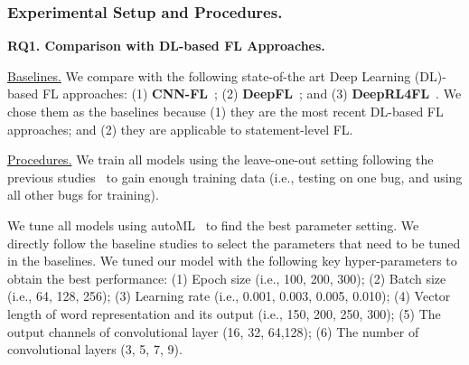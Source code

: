 \subsubsection{Experimental Setup and Procedures.\\}

{\bf RQ1. Comparison with DL-based FL Approaches.}

\underline{Baselines.}
We compare {\tool} with the following state-of-the art Deep Learning
(DL)-based FL approaches: (1) \textbf{CNN-FL}~\cite{zhang2019cnn}; (2)
{\bf DeepFL}~\cite{DeepFL}; and (3) {\bf DeepRL4FL}~\cite{icse21-fl}.
We chose them as the baselines because (1) they are the most recent
DL-based FL approaches; and (2) they are applicable to statement-level
FL.


\underline{Procedures.}
We train all models using the leave-one-out setting following the
previous studies~\cite{DeepFL, TraPT} to gain enough training data
(i.e., testing on one bug, and using all other bugs for
training).




We tune all models using autoML~\cite{NNI} to find the best parameter
setting. We directly follow the baseline studies to select the
parameters that need to be tuned in the baselines.
We tuned our model with the following key hyper-parameters to obtain
the best performance: (1) Epoch size (i.e., 100, 200, 300); (2) Batch
size (i.e., 64, 128, 256); (3) Learning rate (i.e., 0.001, 0.003,
0.005, 0.010); (4) Vector length of word representation and its output
(i.e., 150, 200, 250, 300); (5) The output channels of convolutional
layer (16, 32, 64,128); (6) The number of convolutional layers (3, 5,
7, 9).

